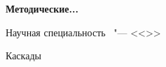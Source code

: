\thispagestyle{empty}
\begin{center}
\thesisOrganization
\end{center}
%
\vspace{0pt plus4fill} %
\begin{center}
\textbf {\large Методические...}
\end{center}
%
\begin{center}
{\large %
\thesisTitle}

\vspace{0pt plus2fill} %
\begin{minipage}[b]{0.5\linewidth}
    \begin{flushright}
        Научная специальность \thesisSpecialtyNumber\ "---
        <<\thesisSpecialtyTitle>>
    \end{flushright}
  \end{minipage}

\vspace{0pt plus2fill} %
\end{center}


\hfill
Каскады
